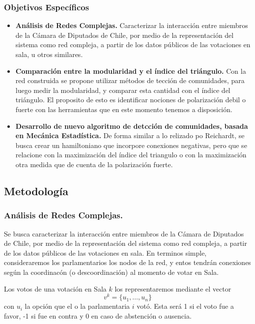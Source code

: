 \documentclass{proyectotesis}
\begin{document}
\subsubsection*{Objetivos Específicos}
\begin{itemize}
\item    {\bf Análisis de Redes Complejas.} Caracterizar la interacción entre miembros de la Cámara de Diputados de Chile, por medio de la representación del sistema como red compleja, a partir de los datos públicos de las votaciones en sala, u otros similares.

\item{\bf Comparación entre la modularidad y el índice del triángulo.} Con la red construida se propone utilizar métodos de tección de comunidades, para luego medir la modularidad, y comparar esta cantidad con el índice del triángulo. El proposito de esto es identificar nociones de polarización debil o fuerte con las herramientas que en este momento tenemos a disposición.

\item {\bf Desarrollo de nuevo algoritmo de detcción de comunidades, basada en Mecánica Estadística.} De forma similar a lo relizado po Reichardt, se busca crear un hamiltoniano que incorpore conexiones negativas, pero que se relacione con la maximización del índice del triangulo o con la maximización otra medida que de cuenta de la polarización fuerte.

\end{itemize}

\subsection{Metodología}
\subsubsection{Análisis de Redes Complejas.}
Se busca caracterizar la interacción entre miembros de la Cámara de Diputados de Chile, por medio de la representación del sistema como red compleja, a partir de los datos públicos de las votaciones en sala. En terminos simple, consideraremos los parlamentarios los nodos de la red, y entos tendrán conexiones según la coordinacón (o descoordinación) al momento de votar en Sala.

Los votos de una votación en Sala $k$ los representaremos mediante el vector 
\begin{equation}
    v^k = \{u_1,\dots,u_n\}
\end{equation}
con $u_i$ la opción que el o la parlamentaria $i$ votó. Esta será 1 si el voto fue a favor, -1 si fue en contra y 0 en caso de abstención o ausencia.
\end{document}
